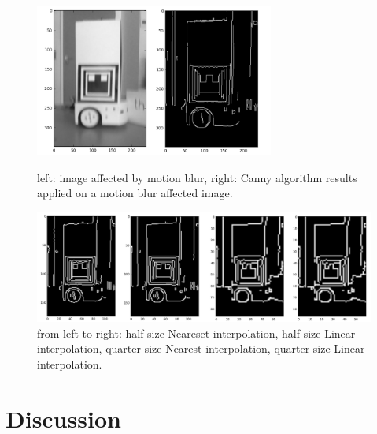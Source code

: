 \documentclass[a4paper]{report}
\begin{document}
\begin{figure}[H]
    \centering
    \includegraphics[width=0.7\textwidth]{BlurEdges.png}
    \caption{left: image affected by motion blur, right: Canny algorithm results applied on a motion blur affected image.}
    \label{fig:blur1}
     \centering
    \includegraphics[width=1.0\textwidth]{BlurEdges_N2_L2_N4_L4.png}
    \caption{from left to right: half size Neareset interpolation, half size Linear interpolation, quarter size Nearest interpolation, quarter size Linear interpolation.}
    \label{fig:blur2}
\end{figure}

\section{Discussion}
\end{document}
